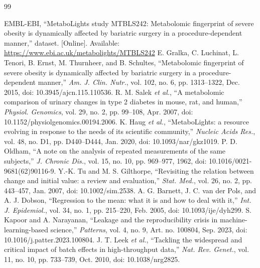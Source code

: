 \begin{thebibliography}{99}

 EMBL-EBI, ``MetaboLights study MTBLS242: Metabolomic fingerprint of severe obesity is dynamically affected by bariatric surgery in a procedure-dependent manner,'' dataset. [Online]. Available: \url{https://www.ebi.ac.uk/metabolights/MTBLS242}
 E. Gralka, C. Luchinat, L. Tenori, B. Ernst, M. Thurnheer, and B. Schultes, ``Metabolomic fingerprint of severe obesity is dynamically affected by bariatric surgery in a procedure-dependent manner,'' \textit{Am. J. Clin. Nutr.}, vol. 102, no. 6, pp. 1313--1322, Dec. 2015, doi: 10.3945/ajcn.115.110536.
 R. M. Salek \textit{et al.}, ``A metabolomic comparison of urinary changes in type 2 diabetes in mouse, rat, and human,'' \textit{Physiol. Genomics}, vol. 29, no. 2, pp. 99--108, Apr. 2007, doi: 10.1152/physiolgenomics.00194.2006.
 K. Haug \textit{et al.}, ``MetaboLights: a resource evolving in response to the needs of its scientific community,'' \textit{Nucleic Acids Res.}, vol. 48, no. D1, pp. D440--D444, Jan. 2020, doi: 10.1093/nar/gkz1019.
 P. D. Oldham, ``A note on the analysis of repeated measurements of the same subjects,'' \textit{J. Chronic Dis.}, vol. 15, no. 10, pp. 969--977, 1962, doi: 10.1016/0021-9681(62)90116-9.
 Y.-K. Tu and M. S. Gilthorpe, ``Revisiting the relation between change and initial value: a review and evaluation,'' \textit{Stat. Med.}, vol. 26, no. 2, pp. 443--457, Jan. 2007, doi: 10.1002/sim.2538.
 A. G. Barnett, J. C. van der Pols, and A. J. Dobson, ``Regression to the mean: what it is and how to deal with it,'' \textit{Int. J. Epidemiol.}, vol. 34, no. 1, pp. 215--220, Feb. 2005, doi: 10.1093/ije/dyh299.
 S. Kapoor and A. Narayanan, ``Leakage and the reproducibility crisis in machine-learning-based science,'' \textit{Patterns}, vol. 4, no. 9, Art. no. 100804, Sep. 2023, doi: 10.1016/j.patter.2023.100804.
 J. T. Leek \textit{et al.}, ``Tackling the widespread and critical impact of batch effects in high-throughput data,'' \textit{Nat. Rev. Genet.}, vol. 11, no. 10, pp. 733--739, Oct. 2010, doi: 10.1038/nrg2825.

\end{thebibliography}
